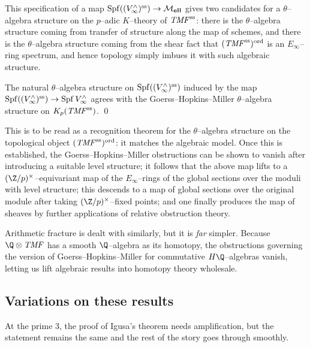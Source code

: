 \noindent This specification of a map $\operatorname{Spf} ((V^\wedge_\infty)^{\mathrm{ss}}) \to \mathcal{M}_{\mathbf{ell}}$ gives two candidates for a $\theta$--algebra structure on the $p$--adic $K$--theory of $\mathit{TMF}^{\mathrm{ss}}$: there is the $\theta$--algebra structure coming from transfer of structure along the map of schemes, and there is the $\theta$--algebra structure coming from the shear fact that $(\mathit{TMF}^{\mathrm{ss}})^{\mathrm{ord}}$ is an $E_\infty$--ring spectrum, and hence topology simply imbues it with such algebraic structure.

\begin{theorem}
The natural $\theta$--algebra structure on $\operatorname{Spf} ((V^\wedge_\infty)^{\mathrm{ss}})$ induced by the map $\operatorname{Spf} ((V^\wedge_\infty)^{\mathrm{ss}}) \to \operatorname{Spf} V^\wedge_\infty$ agrees with the Goerss--Hopkins--Miller $\theta$--algebra structure on $K_p (\mathit{TMF}^{\mathrm{ss}})$. \qed
\end{theorem}

\noindent This is to be read as a recognition theorem for the $\theta$--algebra structure on the topological object $(\mathit{TMF}^{\mathrm{ss}})^{\mathrm{ord}}$: it matches the algebraic model.  Once this is established, the Goerss--Hopkins--Miller obstructions can be shown to vanish after introducing a suitable level structure; it follows that the above map lifts to a $(\Z/p)^{\times}$--equivariant map of the $E_\infty$--rings of the global sections over the moduli with level structure; this descends to a map of global sections over the original module after taking $(\Z/p)^\times$--fixed points; and one finally produces the map of sheaves by further applications of relative obstruction theory.

\begin{remark}
Arithmetic fracture is dealt with similarly, but it is \emph{far} simpler.  Because $\Q \otimes \TMF$ has a smooth $\Q$--algebra as its homotopy, the obstructions governing the version of Goerss--Hopkins--Miller for commutative $H\Q$--algebras vanish, letting us lift algebraic results into homotopy theory wholesale.
\end{remark}






\subsection*{Variations on these results}

\begin{remark}
At the prime $3$, the proof of Igusa's theorem needs amplification, but the statement remains the same and the rest of the story goes through smoothly.
\end{remark}

